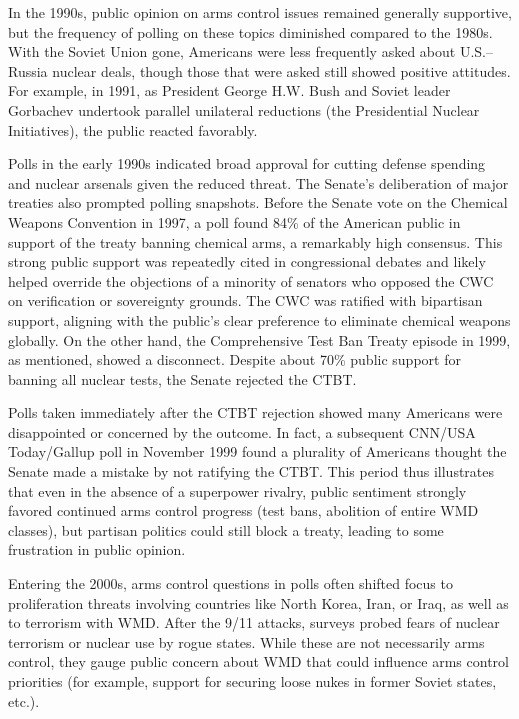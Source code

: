 \documentclass[11,5 pt]{article}
\begin{document}
    In the 1990s, public opinion on arms control issues remained generally supportive, but the frequency of polling on these topics diminished compared to the 1980s. With the Soviet Union gone, Americans were less frequently asked about U.S.–Russia nuclear deals, though those that were asked still showed positive attitudes. For example, in 1991, as President George H.W. Bush and Soviet leader Gorbachev undertook parallel unilateral reductions (the Presidential Nuclear Initiatives), the public reacted favorably. 
    
    Polls in the early 1990s indicated broad approval for cutting defense spending and nuclear arsenals given the reduced threat. The Senate’s deliberation of major treaties also prompted polling snapshots. Before the Senate vote on the Chemical Weapons Convention in 1997, a poll found 84\% of the American public in support of the treaty banning chemical arms, a remarkably high consensus. This strong public support was repeatedly cited in congressional debates and likely helped override the objections of a minority of senators who opposed the CWC on verification or sovereignty grounds. The CWC was ratified with bipartisan support, aligning with the public’s clear preference to eliminate chemical weapons globally. On the other hand, the Comprehensive Test Ban Treaty episode in 1999, as mentioned, showed a disconnect. Despite about 70\% public support for banning all nuclear tests, the Senate rejected the CTBT. 
    
    Polls taken immediately after the CTBT rejection showed many Americans were disappointed or concerned by the outcome. In fact, a subsequent CNN/USA Today/Gallup poll in November 1999 found a plurality of Americans thought the Senate made a mistake by not ratifying the CTBT. This period thus illustrates that even in the absence of a superpower rivalry, public sentiment strongly favored continued arms control progress (test bans, abolition of entire WMD classes), but partisan politics could still block a treaty, leading to some frustration in public opinion. 
    
    Entering the 2000s, arms control questions in polls often shifted focus to proliferation threats involving countries like North Korea, Iran, or Iraq, as well as to terrorism with WMD. After the 9/11 attacks, surveys probed fears of nuclear terrorism or nuclear use by rogue states. While these are not necessarily arms control, they gauge public concern about WMD that could influence arms control priorities (for example, support for securing loose nukes in former Soviet states, etc.). 
    
\end{document}
